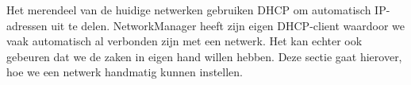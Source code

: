 Het merendeel van de huidige netwerken gebruiken DHCP om automatisch IP-adressen uit te delen. NetworkManager heeft zijn eigen DHCP-client waardoor we vaak automatisch al verbonden zijn met een netwerk. Het kan echter ook gebeuren dat we de zaken in eigen hand willen hebben. Deze sectie gaat hierover, hoe we een netwerk handmatig kunnen instellen.


